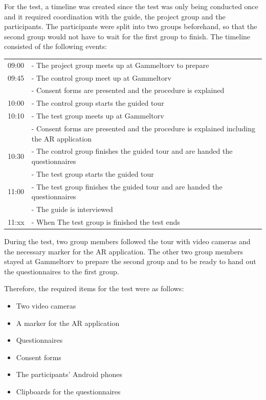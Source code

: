 For the test, a timeline was created since the test was only being conducted once and it required coordination with the guide, the project group and the participants. The participants were split into two groups beforehand, so that the second group would not have to wait for the first group to finish. The timeline consisted of the following events: 

\begin{tabular}{l p{12cm}}
09:00 & - The project group meets up at Gammeltorv to prepare \\
09:45 & - The control group meet up at Gammeltorv \\
 & - Consent forms are presented and the procedure is explained \\
10:00 &   - The control group starts the guided tour \\
10:10 & - The test group meets up at Gammeltorv \\
 & - Consent forms are presented and the procedure is explained including the AR application \\
10:30 & - The control group finishes the guided tour and are handed the questionnaires \\
 & - The test group starts the guided tour
\\ 
11:00 & - The test group finishes the guided tour and are handed the questionnaires \\
 & - The guide is interviewed \\
11:xx & - When The test group is finished the test ends \\
\end{tabular}

During the test, two group members followed the tour with video cameras and the necessary marker for the AR application. The other two group members stayed at Gammeltorv to prepare the second group and to be ready to hand out the questionnaires to the first group. 

Therefore, the required items for the test were as follows:

\begin{itemize}
\item Two video cameras
\item A marker for the AR application
\item Questionnaires
\item Consent forms
\item The participants’ Android phones
\item Clipboards for the questionnaires
\end{itemize}

